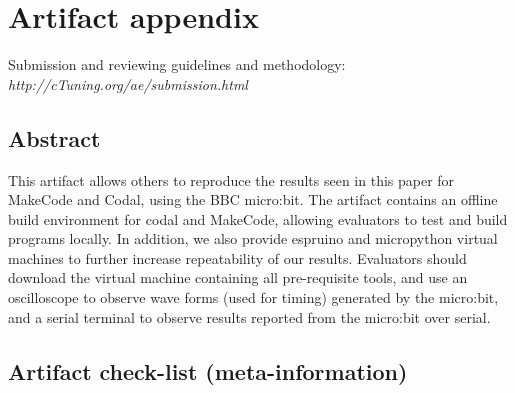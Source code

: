 \appendix
\pagebreak

\section{Artifact appendix}

Submission and reviewing guidelines and methodology: \\
{\em http://cTuning.org/ae/submission.html}

\subsection{Abstract}

This artifact allows others to reproduce the results seen in this paper for MakeCode and Codal, using the BBC micro:bit. The artifact contains an offline build environment for codal and MakeCode, allowing evaluators to test and build programs locally. In addition, we also provide espruino and micropython virtual machines to further increase repeatability of our results. Evaluators should download the virtual machine containing all pre-requisite tools, and use an oscilloscope to observe wave forms (used for timing) generated by the micro:bit, and a serial terminal to observe results reported from the micro:bit over serial.


\subsection{Artifact check-list (meta-information)}

